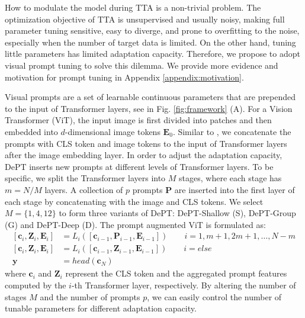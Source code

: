 \documentclass{article} \usepackage{iclr2023_conference,times}
\def\vc{{\bm{c}}}
\def\vy{{\bm{y}}}
\def\mE{{\bm{E}}}
\def\mP{{\bm{P}}}
\def\mZ{{\bm{Z}}}
\begin{document}
How to modulate the model during TTA is a non-trivial problem. The optimization objective of TTA is unsupervised and usually noisy, making full parameter tuning sensitive, easy to diverge, and prone to overfitting to the noise, especially when the number of target data is limited. On the other hand, tuning little parameters has limited adaptation capacity. Therefore, we propose to adopt visual prompt tuning to solve this dilemma. We provide more evidence and motivation for prompt tuning in Appendix \ref{appendix:motivation}.

Visual prompts are a set of learnable continuous parameters that are prepended to the input of Transformer layers, see in Fig. \ref{fig:framework} (A). For a Vision Transformer (ViT), the input image is first divided into patches and then embedded into $d$-dimensional image tokens $\displaystyle \mE_0$. Similar to \citet{jia2022visual}, we concatenate the prompts with CLS token and image tokens to the input of Transformer layers after the image embedding layer. In order to adjust the adaptation capacity, DePT inserts new prompts at different levels of Transformer layers. To be specific, we split the Transformer layers into $M$ stages, where each stage has $m=N/M$ layers. A collection of $p$ prompts $\displaystyle \mP$ are inserted into the first layer of each stage by concatenating with the image and CLS tokens. We select $M=\{1, 4, 12\}$ to form three variants of DePT: DePT-Shallow (S), DePT-Group (G) and DePT-Deep (D). The prompt augmented ViT is formulated as:
\begin{equation}
    \begin{split}
        [\displaystyle \vc_i, \displaystyle \mZ_i, \displaystyle \mE_i] &= L_i([\displaystyle \vc_{i-1}, \displaystyle \mP_{i-1}, \displaystyle \mE_{i-1}])  \quad \quad i=1, m+1, 2m+1, \dots, N-m \\
        [\displaystyle \vc_i, \displaystyle \mZ_i, \displaystyle \mE_i] &= L_i([\displaystyle \vc_{i-1}, \displaystyle \mZ_{i-1}, \displaystyle \mE_{i-1}]) \quad \quad i=else \\
        \displaystyle \vy &= head(\displaystyle \vc_N)
    \end{split}
\end{equation}
where $\displaystyle \vc_i$ and $\displaystyle \mZ_i$ represent the CLS token and the aggregated prompt features computed by the $i$-th Transformer layer, respectively. By altering the number of stages $M$ and the number of prompts $p$, we can easily control the number of tunable parameters for different adaptation capacity.
\end{document}
